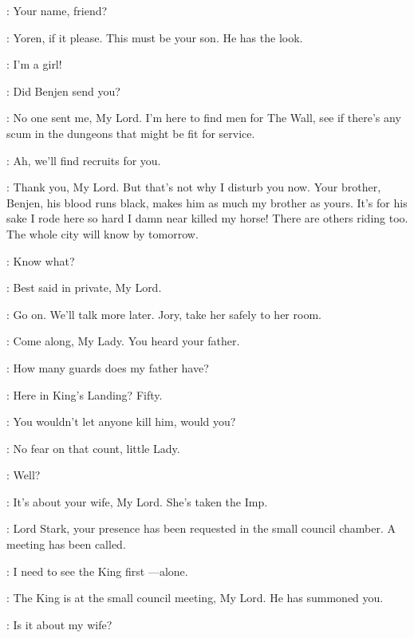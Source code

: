 
\NED: Your name, friend? 

\YOREN: Yoren, if it please. This must be your son. He has the look. 

\ARYA: I'm a girl! 

\NED: Did Benjen send you? 

\YOREN: No one sent me, My Lord. I'm here to find men for The Wall, see if there's any scum in the dungeons that might be fit for service. 

\NED: Ah, we'll find recruits for you. 

\YOREN: Thank you, My Lord. But that's not why I disturb you now. Your brother, Benjen, his blood runs black, makes him as much my brother as yours. It's for his sake I rode here so hard I damn near killed my horse! There are others riding too. The whole city will know by tomorrow. 

\NED: Know what? 

\YOREN: Best said in private, My Lord. 

\NED:   Go on. We'll talk more later. Jory, take her safely to her room. 

\JORY: Come along, My Lady. You heard your father. 


\ARYA: How many guards does my father have? 

\JORY: Here in King's Landing? Fifty. 

\ARYA: You wouldn't let anyone kill him, would you? 

\JORY: No fear on that count, little Lady. 


\NED: Well? 

\YOREN: It's about your wife, My Lord. She's taken the Imp. 



\STEWARD: Lord Stark, your presence has been requested in the small council chamber. A meeting has been called. 

\NED: I need to see the King first ---alone. 

\STEWARD: The King is at the small council meeting, My Lord. He has summoned you. 

\NED: Is it about my wife? 

